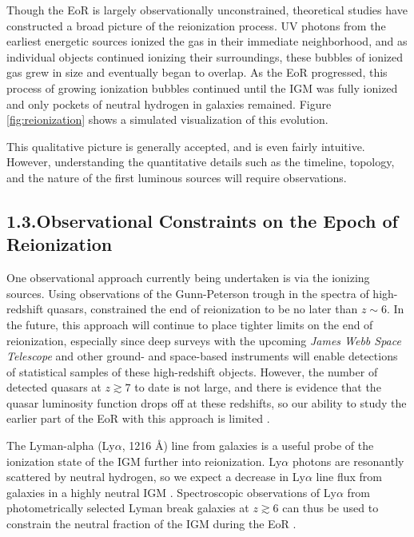 \documentclass[12pt]{article}
\begin{document}
Though the EoR is largely observationally unconstrained, theoretical studies have constructed a broad picture of the reionization process. UV photons from the earliest energetic sources ionized the gas in their immediate neighborhood, and as individual objects continued ionizing their surroundings, these bubbles of ionized gas grew in size and eventually began to overlap. As the EoR progressed, this process of growing ionization bubbles continued until the IGM was fully ionized and only pockets of neutral hydrogen in galaxies remained. Figure \ref{fig:reionization} shows a simulated visualization of this evolution.

This qualitative picture is generally accepted, and is even fairly intuitive. However, understanding the quantitative details such as the timeline, topology, and the nature of the first luminous sources will require observations. \vspace{3mm}

\tocless\subsection{\hypertarget{subsec:constraints}{1.3.\hspace{0.75em}Observational Constraints on the Epoch of Reionization}}

One observational approach currently being undertaken is via the ionizing sources. Using observations of the Gunn-Peterson trough in the spectra of high-redshift quasars, \cite{fan2006} constrained the end of reionization to be no later than $z \sim 6$. In the future, this approach will continue to place tighter limits on the end of reionization, especially since deep surveys with the upcoming \textit{James Webb Space Telescope} and other ground- and space-based instruments will enable detections of statistical samples of these high-redshift objects. However, the number of detected quasars at $z \gtrsim 7$ to date is not large, and there is evidence that the quasar luminosity function drops off at these redshifts, so our ability to study the earlier part of the EoR with this approach is limited \citep{richards2006, hopkins2007}.

The Lyman-alpha (Ly$\alpha$, 1216 \AA) line from galaxies is a useful probe of the ionization state of the IGM further into reionization. Ly$\alpha$ photons are resonantly scattered by neutral hydrogen, so we expect a decrease in Ly$\alpha$ line flux from galaxies in a highly neutral IGM \citep{malhotra2004}. Spectroscopic observations of Ly$\alpha$ from photometrically selected Lyman break galaxies at $z \gtrsim 6$ can thus be used to constrain the neutral fraction of the IGM during the EoR \citep{mason2018}.
\end{document}
